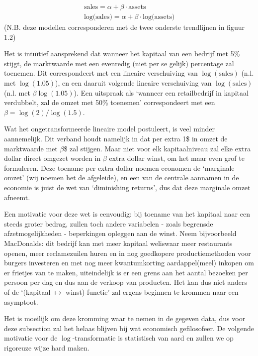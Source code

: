 \documentclass[a4paper]{report}
\begin{document}
\begin{align}
  \text{sales} = \alpha + \beta \cdot \text{assets} \\
  \text{log(sales)} = \alpha + \beta \cdot \text{log(assets)}
\end{align}
  (N.B. deze modellen corresponderen met de twee onderste trendlijnen in figuur 1.2)
  
  Het is intu\"itief aansprekend dat wanneer het kapitaal van een bedrijf met 5\% stijgt, de marktwaarde met een evenredig (niet per se gelijk) percentage zal toenemen. Dit correspondeert met een lineaire verschuiving van $\log(\text{sales})$ (n.l. met $\log(1.05)$), en een daaruit volgende lineaire verschuiving van $\log(\text{sales})$ (n.l. met $\beta \log(1.05)$). Een uitspraak als `wanneer een retailbedrijf in kapitaal verdubbelt, zal de omzet met 50\% toenemen' correspondeert met een $\beta = \log(2)/\log(1.5)$.
  
  Wat het ongetransformeerde lineaire model postuleert, is veel minder aannemelijk. Dit verband houdt namelijk in dat per extra 1\$ in omzet de marktwaarde met $\beta$\$ zal stijgen. Maar niet voor elk kapitaalniveau zal elke extra dollar direct omgezet worden in $\beta$ extra dollar winst, om het maar even grof te formuleren. Deze toename per extra dollar noemen economen de `marginale omzet' (wij noemen het de afgeleide), en een van de centrale aannamen in de economie is juist de wet van `diminishing returns', dus dat deze marginale omzet afneemt. 
  
  Een motivatie voor deze wet is eenvoudig: bij toename van het kapitaal naar een steeds groter bedrag, zullen toch andere variabelen - zoals begrensde afzetmogelijkheden - beperkingen opleggen aan de winst. Neem bijvoorbeeld MacDonalds: dit bedrijf kan met meer kapitaal weliswaar meer restaurants openen, meer reclamezuilen huren en in nog goedkopere productiemethoden voor burgers investeren en met nog meer kwantumkorting aardappel(meel) inkopen om er frietjes van te maken, uiteindelijk is er een grens aan het aantal bezoeken per persoon per dag en dus aan de verkoop van producten. Het kan dus niet anders of de `(kapitaal $\mapsto$ winst)-functie' zal ergens beginnen te krommen naar een asymptoot.
  
  
  Het is moeilijk om deze kromming waar te nemen in de gegeven data, dus voor deze subsection zal het helaas blijven bij wat economisch gefilosofeer. De volgende motivatie voor de $\log$-transformatie is statistisch van aard en zullen we op rigoreuze wijze hard maken.
  
\end{document}
